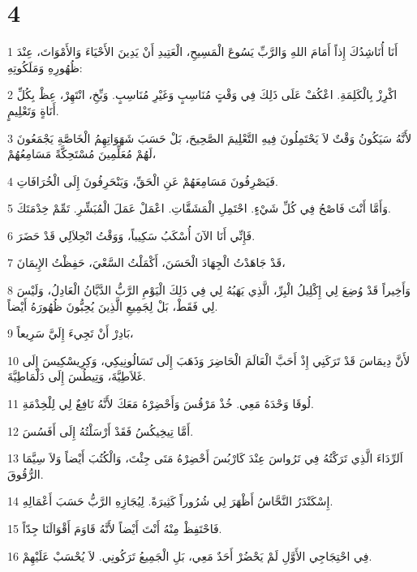 \chapter{4}

\par 1 أَنَا أُنَاشِدُكَ إِذاً أَمَامَ اللهِ وَالرَّبِّ يَسُوعَ الْمَسِيحِ، الْعَتِيدِ أَنْ يَدِينَ الأَحْيَاءَ وَالأَمْوَاتَ، عِنْدَ ظُهُورِهِ وَمَلَكُوتِهِ:
\par 2 اكْرِزْ بِالْكَلِمَةِ. اعْكُفْ عَلَى ذَلِكَ فِي وَقْتٍ مُنَاسِبٍ وَغَيْرِ مُنَاسِبٍ. وَبِّخِ، انْتَهِرْ، عِظْ بِكُلِّ أَنَاةٍ وَتَعْلِيمٍ.
\par 3 لأَنَّهُ سَيَكُونُ وَقْتٌ لاَ يَحْتَمِلُونَ فِيهِ التَّعْلِيمَ الصَّحِيحَ، بَلْ حَسَبَ شَهَوَاتِهِمُ الْخَاصَّةِ يَجْمَعُونَ لَهُمْ مُعَلِّمِينَ مُسْتَحِكَّةً مَسَامِعُهُمْ،
\par 4 فَيَصْرِفُونَ مَسَامِعَهُمْ عَنِ الْحَقِّ، وَيَنْحَرِفُونَ إِلَى الْخُرَافَاتِ.
\par 5 وَأَمَّا أَنْتَ فَاصْحُ فِي كُلِّ شَيْءٍ. احْتَمِلِ الْمَشَقَّاتِ. اعْمَلْ عَمَلَ الْمُبَشِّرِ. تَمِّمْ خِدْمَتَكَ.
\par 6 فَإِنِّي أَنَا الآنَ أُسْكَبُ سَكِيباً، وَوَقْتُ انْحِلاَلِي قَدْ حَضَرَ.
\par 7 قَدْ جَاهَدْتُ الْجِهَادَ الْحَسَنَ، أَكْمَلْتُ السَّعْيَ، حَفِظْتُ الإِيمَانَ،
\par 8 وَأَخِيراً قَدْ وُضِعَ لِي إِكْلِيلُ الْبِرِّ، الَّذِي يَهَبُهُ لِي فِي ذَلِكَ الْيَوْمِ الرَّبُّ الدَّيَّانُ الْعَادِلُ، وَلَيْسَ لِي فَقَطْ، بَلْ لِجَمِيعِ الَّذِينَ يُحِبُّونَ ظُهُورَهُ أَيْضاً.
\par 9 بَادِرْ أَنْ تَجِيءَ إِلَيَّ سَرِيعاً،
\par 10 لأَنَّ دِيمَاسَ قَدْ تَرَكَنِي إِذْ أَحَبَّ الْعَالَمَ الْحَاضِرَ وَذَهَبَ إِلَى تَسَالُونِيكِي، وَكِرِيسْكِيسَ إِلَى غَلاَطِيَّةَ، وَتِيطُسَ إِلَى دَلْمَاطِيَّةَ.
\par 11 لُوقَا وَحْدَهُ مَعِي. خُذْ مَرْقُسَ وَأَحْضِرْهُ مَعَكَ لأَنَّهُ نَافِعٌ لِي لِلْخِدْمَةِ.
\par 12 أَمَّا تِيخِيكُسُ فَقَدْ أَرْسَلْتُهُ إِلَى أَفَسُسَ.
\par 13 اَلرِّدَاءَ الَّذِي تَرَكْتُهُ فِي تَرُواسَ عِنْدَ كَارْبُسَ أَحْضِرْهُ مَتَى جِئْتَ، وَالْكُتُبَ أَيْضاً وَلاَ سِيَّمَا الرُّقُوقَ.
\par 14 إِسْكَنْدَرُ النَّحَّاسُ أَظْهَرَ لِي شُرُوراً كَثِيرَةً. لِيُجَازِهِ الرَّبُّ حَسَبَ أَعْمَالِهِ.
\par 15 فَاحْتَفِظْ مِنْهُ أَنْتَ أَيْضاً لأَنَّهُ قَاوَمَ أَقْوَالَنَا جِدّاً.
\par 16 فِي احْتِجَاجِي الأَوَّلِ لَمْ يَحْضُرْ أَحَدٌ مَعِي، بَلِ الْجَمِيعُ تَرَكُونِي. لاَ يُحْسَبْ عَلَيْهِمْ.
